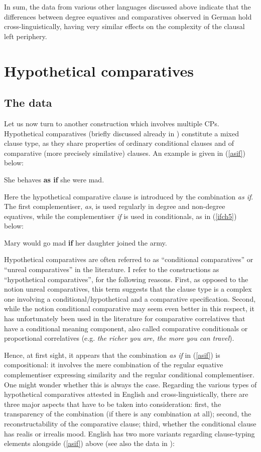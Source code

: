 In sum, the data from various other languages discussed above indicate that the differences between degree equatives and comparatives observed in German hold cross-linguistically, having very similar effects on the complexity of the clausal left periphery.

\section{Hypothetical comparatives} \label{sec:5hypothetical}
\subsection{The data} \label{sec:5datahypothetical}
Let us now turn to another construction which involves multiple CPs. Hypothetical comparatives (briefly discussed already in ) constitute a mixed clause type, as they share properties of ordinary conditional clauses and of comparative (more precisely similative) clauses. An example is given in (\ref{asif}) below:

\ea She behaves \textbf{as if} she were mad. \label{asif}
\z

Here the hypothetical comparative clause is introduced by the combination \textit{as if}. The first complementiser, \textit{as}, is used regularly in degree and non-degree equatives, while the complementiser \textit{if} is used in conditionals, as in (\ref{ifch5}) below:

\ea Mary would go mad \textbf{if} her daughter joined the army. \label{ifch5}
\z

Hypothetical comparatives are often referred to as ``conditional comparatives'' or ``unreal comparatives'' in the literature. I refer to the constructions as ``hypothetical comparatives'', for the following reasons. First, as opposed to the notion unreal comparatives, this term suggests that the clause type is a complex one involving a conditional/hypothetical and a comparative specification. Second, while the notion conditional comparative may seem even better in this respect, it has unfortunately been used in the literature for comparative correlatives that have a conditional meaning component, also called comparative conditionals or proportional correlatives (e.g. \textit{the richer you are, the more you can travel}).

Hence, at first sight, it appears that the combination \textit{as if} in (\ref{asif}) is compositional: it involves the mere combination of the regular equative complementiser expressing similarity and the regular conditional complementiser. One might wonder whether this is always the case. Regarding the various types of hypothetical comparatives attested in English and cross-linguistically, there are three major aspects that have to be taken into consideration: first, the transparency of the combination (if there is any combination at all); second, the reconstructability of the comparative clause; third, whether the conditional clause has realis or irrealis mood. English has two more variants regarding clause-typing elements alongside (\ref{asif}) above (see also the data in \citealt{pfeffer1985}):

